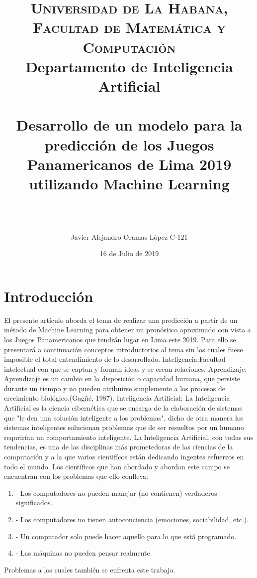 \documentclass[a4paper,12pt]{article}
\title{	
\normalfont \normalsize 
\textsc{Universidad de La Habana, Facultad de Matem\'{a}tica y Computaci\'{o}n } \\
Departamento de Inteligencia Artificial\\[25pt] %
\horrule{0.5pt} \\[0.4cm] %
\huge Desarrollo de un modelo para la predicci\'{o}n de los Juegos Panamericanos de Lima 2019 utilizando Machine Learning \\ %
\horrule{2pt} \\[0.5cm] %
}
\author{\\\name Javier Alejandro Oramas L\'{o}pez C-121}
\date{16 de Julio de 2019} %
\begin{document}
\maketitle
\newpage
\section{Introducci\'{o}n}
	\cline{-}El presente art\'{i}culo aborda el tema de realizar una predicci\'{o}n a partir de un m\'{e}todo de Machine Learning para obtener un pron\'{o}stico aproximado con vista a los Juegos Panamericanos que tendr\'{a}n lugar en Lima este 2019.
 	\cline{-} Para ello se presentar\'{a} a continuaci\'{o}n conceptos introductorios al tema sin los cuales fuese imposible el total entendimiento de lo desarrollado.
	\cline{-} Inteligencia:Facultad intelectual con que se captan y forman ideas y se crean  relaciones. 
	\cline{-} Aprendizaje: Aprendizaje es un cambio en la disposici\'{o}n o capacidad humana, que persiste durante un tiempo y no pueden atribuirse simplemente a los procesos de crecimiento biol\'{o}gico.(Gag\~{n}\'{e}, 1987).
	\cline{-} Inteligencia Artificial: La Inteligencia Artificial es la ciencia cibern\'{e}tica que se encarga de la elaboraci\'{o}n de sistemas que "le den una soluci\'{o}n inteligente a los problemas", dicho de otra manera los sistemas inteligentes solucionan problemas que de ser resueltos por un humano requrir\'{i}an un comportamiento inteligente. La Inteligencia Artificial, con todas sus tendencias, es una de las disciplinas m\'{a}s prometedoras de las ciencias de la computaci\'{o}n y a la que varios cientif\'{i}cos est\'{a}n dedicando ingentes esfuerzos en todo el mundo.
	\cline{-} Los cient\'{i}ficos que han abordado y abordan este campo se encuentran con los problemas que ello conlleva:
	\begin{enumerate}
	\item -	Los computadores no pueden manejar (no contienen) verdaderos significados.
	\item -	Los computadores no tienen autoconciencia (emociones, sociabilidad, etc.). 
	\item -	Un computador solo puede hacer aquello para lo que est\'{a} programado.
	\item -	Las m\'{a}quinas no pueden pensar realmente. 
	\end{enumerate}
Problemas a los cuales tambi\'{e}n se enfrenta este trabajo.
\newpage
\end{document}
